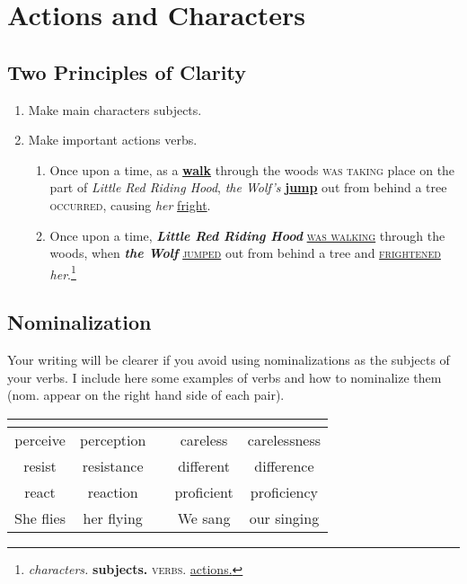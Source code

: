 \documentclass[10pt, oneside]{article}
\begin{document}
\thispagestyle{fancy}

\section{Actions and Characters}

\subsection{Two Principles of Clarity}
\begin{enumerate}
\item Make main characters subjects.
\item Make important actions verbs.\\
\begin{enumerate}
\item Once upon a time, as a \textbf{\underline{walk}} through the woods \textsc{was taking} place on the part of \emph{Little Red Riding Hood}, \emph{the Wolf's} \textbf{\underline{jump}} out from behind a tree \textsc{occurred}, causing \emph{her} \underline{fright}.\\
\item Once upon a time, \textbf{\emph{Little Red Riding Hood}} \textsc{\underline{was walking}} through the woods, when \textbf{\emph{the Wolf}} \textsc{\underline{jumped}} out from behind a tree and \textsc{\underline{frightened}} \emph{her}.\footnote{\emph{characters.} \textbf{subjects.} \textsc{verbs.} \underline{actions.}} 
\end{enumerate}
\end{enumerate}

\subsection{Nominalization}
\noindent Your writing will be clearer if you avoid using nominalizations as the subjects of your verbs. I include here some examples of verbs and how to nominalize them (nom. appear on the right hand side of each pair).
\begin{center}
\begin{tabular}[t]{|c|c|c|c|c|}
\multicolumn{5}{c}{{}}\\\hline
perceive&perception&{}&careless&carelessness\\
resist&resistance&{}&different&difference\\
react&reaction&{}&proficient&proficiency\\
She flies&her flying&{}&We sang&our singing\\\hline
\end{tabular}
\end{center}
\vspace{1mm}
\end{document}
